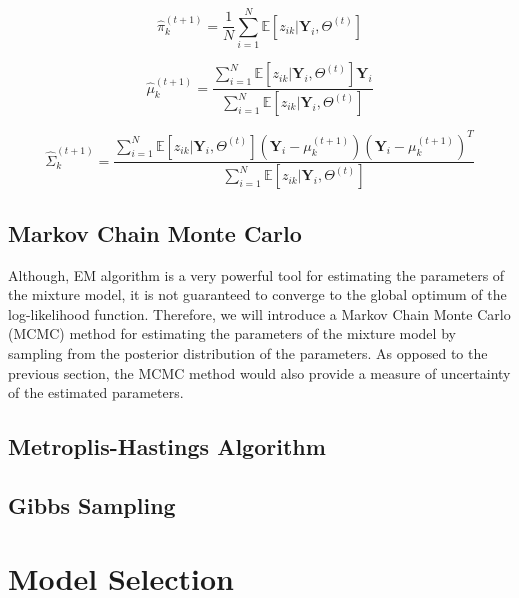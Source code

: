 \begin{equation}
    \hat{\pi}_k^{(t+1)} = \frac{1}{N} \sum_{i=1}^{N} \mathbb{E}[z_{ik}|\textbf{Y}_i,\Theta^{(t)}]
\end{equation}

\begin{equation}
    \hat{\mu}_k^{(t+1)} = \frac{\sum_{i=1}^{N} \mathbb{E}[z_{ik}|\textbf{Y}_i,\Theta^{(t)}] \textbf{Y}_i}{\sum_{i=1}^{N} \mathbb{E}[z_{ik}|\textbf{Y}_i,\Theta^{(t)}]}
\end{equation}

\begin{equation}
    \hat{\Sigma}_k^{(t+1)} = \frac{\sum_{i=1}^{N} \mathbb{E}[z_{ik}|\textbf{Y}_i,\Theta^{(t)}] (\textbf{Y}_i - \mu_k^{(t+1)})(\textbf{Y}_i - \mu_k^{(t+1)})^T}{\sum_{i=1}^{N} \mathbb{E}[z_{ik}|\textbf{Y}_i,\Theta^{(t)}]}
\end{equation}

\subsection{Markov Chain Monte Carlo}

Although, EM algorithm is a very powerful tool for estimating the parameters of the mixture model,
it is not guaranteed to converge to the global optimum of the log-likelihood function. Therefore, 
we will introduce a Markov Chain Monte Carlo (MCMC) method for estimating the parameters of the mixture model by 
sampling from the posterior distribution of the parameters. As opposed to the previous section, the MCMC method
would also provide a measure of uncertainty of the estimated parameters. 

\subsection{Metroplis-Hastings Algorithm}

\subsection{Gibbs Sampling}

\section{Model Selection}
